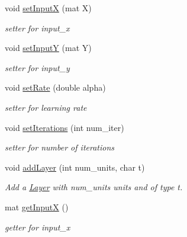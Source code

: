 \begin{DoxyCompactItemize}
void \hyperlink{classNeuralNetwork_a7823498a83db91a5bd6ef211d50a0013}{set\+InputX} (mat X)
\begin{DoxyCompactList}\small\item\em setter for input\+\_\+x \end{DoxyCompactList}\item 
\mbox{\label{classNeuralNetwork_a233c54f713c7ab4487039a362fbf4447}} 
void \hyperlink{classNeuralNetwork_a233c54f713c7ab4487039a362fbf4447}{set\+InputY} (mat Y)
\begin{DoxyCompactList}\small\item\em setter for input\+\_\+y \end{DoxyCompactList}\item 
\mbox{\label{classNeuralNetwork_aa4f8d543148cde6aea8582c877f2ef94}} 
void \hyperlink{classNeuralNetwork_aa4f8d543148cde6aea8582c877f2ef94}{set\+Rate} (double alpha)
\begin{DoxyCompactList}\small\item\em setter for learning rate \end{DoxyCompactList}\item 
\mbox{\label{classNeuralNetwork_a9b6580600f4c3b98a3103940992f3dfd}} 
void \hyperlink{classNeuralNetwork_a9b6580600f4c3b98a3103940992f3dfd}{set\+Iterations} (int num\+\_\+iter)
\begin{DoxyCompactList}\small\item\em setter for number of iterations \end{DoxyCompactList}\item 
\mbox{\label{classNeuralNetwork_aac6bf64c05efc91b9575b2d26768f8b6}} 
void \hyperlink{classNeuralNetwork_aac6bf64c05efc91b9575b2d26768f8b6}{add\+Layer} (int num\+\_\+units, char t)
\begin{DoxyCompactList}\small\item\em Add a \hyperlink{classLayer}{Layer} with num\+\_\+units units and of type t. \end{DoxyCompactList}\item 
\mbox{\label{classNeuralNetwork_ad9be2fc1e0eb3000ca8cdddd9be2fcef}} 
mat \hyperlink{classNeuralNetwork_ad9be2fc1e0eb3000ca8cdddd9be2fcef}{get\+InputX} ()
\begin{DoxyCompactList}\small\item\em getter for input\+\_\+x \end{DoxyCompactList}\item 

\end{DoxyCompactItemize}
